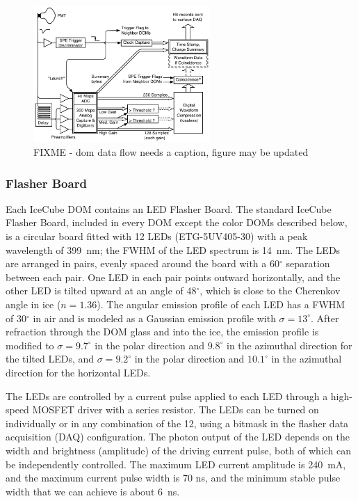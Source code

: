 \begin{figure}[h]
 \centering
 \includegraphics[width=0.6\textwidth]{graphics/dom/functional/domfig3-DOMDataFlow.pdf}
 \caption{FIXME - dom data flow needs a caption, figure may be updated}
 \label{fig:domdataflow}
\end{figure}

\subsubsection{\label{sec:flasher}Flasher Board}

Each IceCube DOM contains an LED Flasher Board. The standard IceCube
Flasher Board, included in every DOM except the color DOMs
described below, is a circular board fitted with 12 LEDs (ETG-5UV405-30) with a peak
wavelength of 399~nm; the FWHM of the LED spectrum is
14~nm. The LEDs are arranged in pairs, evenly spaced around the board
with a 60$^{\circ}$ separation between each pair. One LED in each pair
points outward horizontally, and the other LED is tilted upward at an angle
of 48$^{\circ}$, which is close to the Cherenkov angle in ice ($n =
1.36$).  The angular emission profile of each LED has a FWHM of
30$^{\circ}$ in air and is modeled as a Gaussian emission profile
with $\sigma = 13^{\circ}$. After refraction through the DOM glass and into
the ice, the emission profile is modified to $\sigma = 9.7^{\circ}$ in the polar direction
and $9.8^{\circ}$ in the azimuthal direction for the tilted LEDs, and $\sigma=9.2^{\circ}$ in the polar direction
and $10.1^{\circ}$ in the azimuthal direction for the horizontal LEDs.

The LEDs are controlled by a current pulse applied to each LED through
a high-speed MOSFET driver with a series resistor. The LEDs can be turned on individually or in any
combination of the 12, using a bitmask in the flasher data acquisition (DAQ)
configuration. The photon output of the LED depends on the width and
brightness (amplitude) of the driving current pulse, both of which can be
independently controlled.  The maximum LED current amplitude
is 240~mA, and the maximum current pulse width is 70 ns, and the
minimum stable pulse width that we can achieve is about 6~ns.


